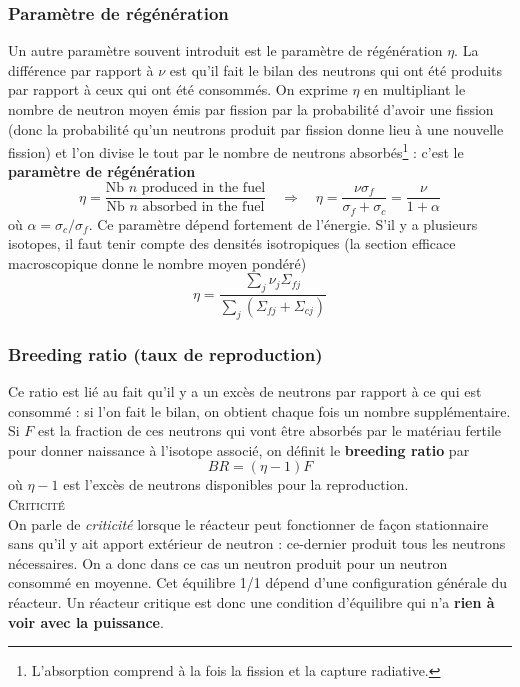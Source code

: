 \subsubsection{Paramètre de régénération}
Un autre paramètre souvent introduit est le paramètre de régénération $\eta$. La différence par rapport à $\nu$ est qu'il 
fait le bilan des neutrons qui ont été produits par rapport à ceux qui ont été consommés.
On exprime $\eta$ en multipliant le nombre de neutron moyen émis par
fission par la probabilité d'avoir une fission (donc la probabilité qu'un neutrons produit par 
fission donne lieu à une nouvelle fission) et l'on divise le tout par le nombre de neutrons
absorbés\footnote{L'absorption comprend à la fois la fission et la capture radiative.} : c'est le \textbf{paramètre de régénération}
\begin{equation}
\eta = \dfrac{\text{Nb $n$ produced in the fuel}}{\text{Nb $n$ absorbed in the fuel}}\quad\Rightarrow
\quad \eta = \dfrac{\nu\sigma_f}{\sigma_f+\sigma_c}=\dfrac{\nu}{1+\alpha}
\end{equation}
où $\alpha = \sigma_c/\sigma_f$. Ce paramètre dépend fortement de l'énergie. S'il y a plusieurs 
isotopes, il faut tenir compte des densités isotropiques (la section efficace macroscopique donne
le nombre moyen pondéré)
\begin{equation}
\eta = \dfrac{\sum_j\nu_j\Sigma_{fj}}{\sum_j \left(\Sigma_{fj}+\Sigma_{cj}\right)}
\end{equation}


\subsubsection{Breeding ratio (taux de reproduction)}
Ce ratio est lié au fait qu'il y a un excès de neutrons par rapport à ce qui est consommé : si l'on 
fait le bilan, on obtient chaque fois un nombre supplémentaire. Si $F$ est la fraction de ces 
neutrons qui vont être absorbés par le matériau fertile pour donner naissance à l'isotope associé, 
on définit le \textbf{breeding ratio} par
\begin{equation}
BR = (\eta-1)F
\end{equation}
où $\eta-1$ est l'excès de neutrons disponibles pour la reproduction.\\

\textsc{Criticité}\\
On parle de \textit{criticité} lorsque le réacteur peut fonctionner de façon stationnaire sans 
qu'il y ait apport extérieur de neutron : ce-dernier produit tous les neutrons nécessaires.
On a donc dans ce cas un neutron produit pour un neutron consommé en moyenne.
Cet équilibre 1/1 dépend d'une configuration générale du réacteur. Un réacteur critique est donc 
une condition d'équilibre qui n'a \textbf{rien à voir avec la puissance}.

